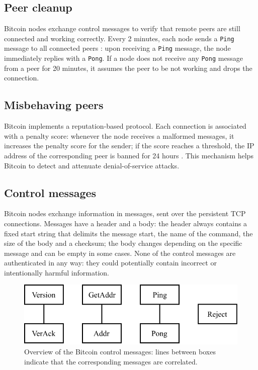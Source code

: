 \subsection{Peer cleanup}
\label{sub:peer-cleanup}
Bitcoin nodes exchange control messages to verify that remote peers are still connected and working correctly.
Every \num{2} minutes, each node sends a \texttt{Ping} message to all connected peers \cite{bitcoin_ping_pong}:
upon receiving a \texttt{Ping} message, the node immediately replies with a \texttt{Pong}.
If a node does not receive any \texttt{Pong} message from a peer for \num{20} minutes, it assumes the peer to be not working and drops the connection.

\subsection{Misbehaving peers}
Bitcoin implements a reputation-based protocol.
Each connection is associated with a penalty score:
whenever the node receives a malformed messages, it increases the penalty score for the sender;
if the score reaches a threshold, the IP address of the corresponding peer is banned for \num{24} hours \cite{deanonymisation_2014}.
This mechanism helps Bitcoin to detect and attenuate denial-of-service attacks.

\subsection{Control messages}
Bitcoin nodes exchange information in messages, sent over the persistent TCP connections.
Messages have a header and a body:
the header always contains a fixed start string that delimits the message start, the name of the command, the size of the body and a checksum;
the body changes depending on the specific message and can be empty in some cases.
None of the control messages are authenticated in any way:
they could potentially contain incorrect or intentionally harmful information.

\begin{figure}[ht]
	\centering
	\vspace*{0.25cm}
	\includegraphics[scale=0.85]{figures/control_messages}
	\vspace*{0.25cm}
	\caption[Overview of the Bitcoin control messages]{
		Overview of the Bitcoin control messages:
		lines between boxes indicate that the corresponding messages are correlated.
	}
	\label{fig:control-messages}
\end{figure}

